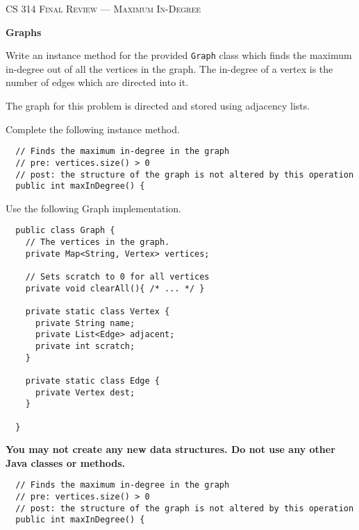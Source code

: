 \documentclass[12pt,letter]{article}
\begin{document}
\noindent\textsc{\large CS 314 Final Review --- Maximum In-Degree}

\vspace{6pt}
\noindent\textbf{Graphs}

\vspace{2pt}
\noindent Write an instance method for the provided \texttt{Graph} class which finds the
maximum in-degree out of all the vertices in the graph. The in-degree of a vertex
is the number of edges which are directed into it.

\vspace{4pt} 
\noindent The graph for this problem is directed and stored using adjacency lists.

\vspace{6pt}
\noindent Complete the following instance method.
\begin{verbatim}
  // Finds the maximum in-degree in the graph
  // pre: vertices.size() > 0
  // post: the structure of the graph is not altered by this operation
  public int maxInDegree() {
\end{verbatim}

\vspace{4pt}
\noindent Use the following Graph implementation.

\begin{verbatim}
  public class Graph {
    // The vertices in the graph.
    private Map<String, Vertex> vertices;

    // Sets scratch to 0 for all vertices
    private void clearAll(){ /* ... */ }

    private static class Vertex {
      private String name;
      private List<Edge> adjacent;
      private int scratch;
    }

    private static class Edge {
      private Vertex dest;
    }    

  }
\end{verbatim}

\noindent \textbf{You may not create any new data structures. \newline Do not use any other Java classes or methods.}

\clearpage
\begin{verbatim}
  // Finds the maximum in-degree in the graph
  // pre: vertices.size() > 0
  // post: the structure of the graph is not altered by this operation
  public int maxInDegree() {\end{verbatim}
 
\end{document}
